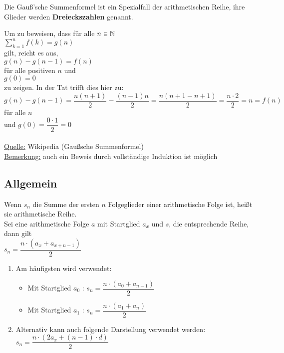 \begin{Bemerkung}
Die Gauß'sche Summenformel ist ein Spezialfall der arithmetischen Reihe, ihre Glieder werden \textbf{Dreieckszahlen} genannt.
\end{Bemerkung}

\begin{Beweis}
Um zu beweisen, dass für alle $n\in\mathbb{N}$\\
$\sum\limits_{k=1}^{n}f(k)=g(n)$\\
 gilt, reicht es aus, \\
$g(n)-g(n-1)=f(n)$\\
 für alle positiven $n$ und\\
 $g(0)=0$\\
 zu zeigen. In der Tat trifft dies hier zu: \\
$g(n)-g(n-1)=\dfrac{n(n+1)}{2}-\dfrac{(n-1)n}{2}=\dfrac{n(n+1-n+1)}{2}=\dfrac{n\cdot 2}{2}=n=f(n)$ \\
für alle $n$ \\
und $g(0)=\dfrac{0\cdot 1}{2}=0$\\
\\
\underline{Quelle:} Wikipedia (Gaußsche Summenformel)\\
\underline{Bemerkung:} auch ein Beweis durch vollständige Induktion ist möglich
\end{Beweis}



	\subsection{Allgemein}

\begin{Definition}
Wenn $s_{n}$ die Summe der ersten $n$ Folgeglieder einer arithmetische Folge ist, heißt sie arithmetische Reihe.\\
Sei eine arithmetische Folge $a$ mit Startglied $a_{x}$ und $s$, die entsprechende Reihe, dann gilt\\
$s_{n}=\dfrac{n\cdot(a_{x}+a_{x+n-1})}{2}$
\end{Definition}

\begin{Bemerkung}
\begin{enumerate}
\item Am häufigsten wird verwendet:
\begin{itemize}
\item Mit Startglied $a_{0}$ : $s_{n}=\dfrac{n\cdot(a_{0}+a_{n-1})}{2}$
\item Mit Startglied $a_{1}$ : $s_{n}=\dfrac{n\cdot(a_{1}+a_{n})}{2}$
\end{itemize}
\item Alternativ kann auch folgende Darstellung verwendet werden:\\
$s_{n}=\dfrac{n\cdot(2a_{x}+(n-1)\cdot d)}{2}$
\end{enumerate}
\end{Bemerkung}

